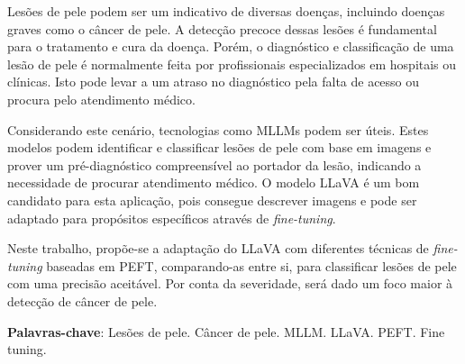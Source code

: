 \imprimircapa

\imprimirfolhaderosto*

\begin{fichacatalografica}
	
\end{fichacatalografica}



% 

\setlength{\absparsep}{18pt}
\begin{resumo}
	\SingleSpacing
	Lesões de pele podem ser um indicativo de diversas doenças, incluindo doenças graves como o câncer de pele. A detecção precoce dessas lesões é fundamental para o
	tratamento e cura da doença. Porém, o diagnóstico e classificação de uma lesão de pele é normalmente feita por profissionais especializados em hospitais ou clínicas.
	Isto pode levar a um atraso no diagnóstico pela falta de acesso ou procura pelo atendimento médico.

	Considerando este cenário, tecnologias como \acp{MLLM} podem ser úteis. Estes modelos podem identificar e classificar lesões de pele com base em imagens e prover um
	pré-diagnóstico compreensível ao portador da lesão, indicando a necessidade de procurar atendimento médico. O modelo \ac{LLaVA} é um bom candidato para esta
	aplicação, pois consegue descrever imagens e pode ser adaptado para propósitos específicos através de \textit{fine-tuning}.

	Neste trabalho, propõe-se a adaptação do \ac{LLaVA} com diferentes técnicas de \textit{fine-tuning} baseadas em \ac{PEFT}, comparando-as entre si, para
	classificar lesões de pele com uma precisão aceitável. Por conta da severidade, será dado um foco maior à detecção de câncer de pele.

	\textbf{Palavras-chave}: Lesões de pele. Câncer de pele. MLLM. LLaVA. PEFT. Fine tuning.
\end{resumo}


